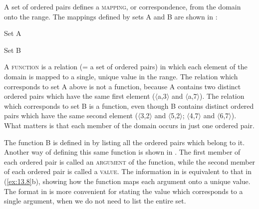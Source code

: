 A set of ordered pairs defines a \textsc{mapping}, or correspondence, from the domain onto the range. The mappings defined by sets A and B are shown in :

\ea \label{ex:13.8}
\ea Set A\\
\ex  Set B\\

\z \z


A \textsc{function} is a relation (= a set of ordered pairs) in which each element of the domain is mapped to a single, unique value in the range. The relation which corresponds to set A above is not a function, because A contains two distinct ordered pairs which have the same first element ($\langle$a,3$\rangle$ and $\langle$a,7$\rangle$). The relation which corresponds to set B is a function, even though B contains distinct ordered pairs which have the same second element ($\langle$3,2$\rangle$ and $\langle$5,2$\rangle$; $\langle$4,7$\rangle$ and $\langle$6,7$\rangle$). What matters is that each member of the domain occurs in just one ordered pair.



The function B is defined in  by listing all the ordered pairs which belong to it. Another way of defining this same function is shown in . The first member of each ordered pair is called an \textsc{argument} of the function, while the second member of each ordered pair is called a \textsc{value}. The information in  is equivalent to that in (\ref{ex:13.8}b), showing how the function maps each argument onto a unique value. The format in  is more convenient for stating the value which corresponds to a single argument, when we do not need to list the entire set.


